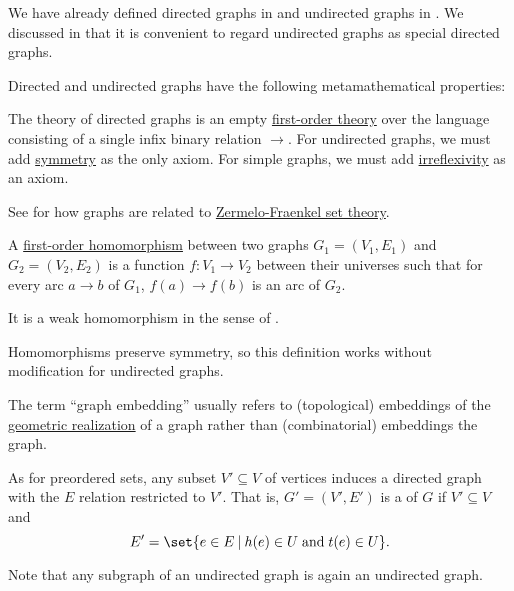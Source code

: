 \begin{definition}\label{def:graph_metamath}
  We have already defined directed graphs in  and undirected graphs in . We discussed in  that it is convenient to regard undirected graphs as special directed graphs.

  Directed and undirected graphs have the following metamathematical properties:
  \begin{thmenum}[resume=def:graph]
     The theory of directed graphs is an empty \hyperref[def:first_order_theory]{first-order theory} over the language consisting of a single infix binary relation \( \to \). For undirected graphs, we must add \hyperref[def:binary_relation/symmetric]{symmetry} as the only axiom. For simple graphs, we must add \hyperref[def:binary_relation/irreflexive]{irreflexivity} as an axiom.

    See  for how graphs are related to \hyperref[def:zfc]{Zermelo-Fraenkel set theory}.

     A \hyperref[def:first_order_homomorphism]{first-order homomorphism} between two graphs \( G_1 = (V_1, E_1) \) and \( G_2 = (V_2, E_2) \) is a function \( f: V_1 \to V_2 \) between their universes such that for every arc \( a \to b \) of \( G_1 \), \( f(a) \to f(b) \) is an arc of \( G_2 \).

    It is a weak homomorphism in the sense of .

    Homomorphisms preserve symmetry, so this definition works without modification for undirected graphs.

    The term \enquote{graph embedding} usually refers to (topological) embeddings of the \hyperref[def:graph_geometric_realization]{geometric realization} of a graph rather than (combinatorial) embeddings the graph.

     As for preordered sets, any subset \( V' \subseteq V \) of vertices induces a directed graph with the \( E \) relation restricted to \( V' \). That is, \( G' = (V', E') \) is a  of \( G \) if \( V' \subseteq V \) and
    \begin{equation*}
      E' = \set{ e \in E \given h(e) \in U \T{and} t(e) \in U }.
    \end{equation*}

    Note that any subgraph of an undirected graph is again an undirected graph.


\end{thmenum}
\end{definition}
